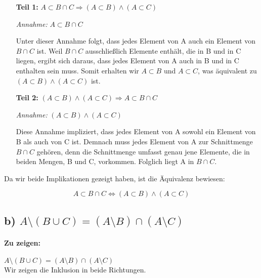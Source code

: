 \documentclass[12pt]{article}
\begin{document}
\begin{enumerate}
	\item[\textbf{Teil 1:}] \( A \subset B \cap C \Rightarrow (A \subset B) \land (A \subset C) \)
		
		\textit{Annahme:} \( A \subset B \cap C \)
		
		Unter dieser Annahme folgt, dass jedes Element von A auch ein Element von \( B \cap C \) ist. Weil \( B \cap C \) ausschließlich Elemente enthält, die in B und in C liegen, ergibt sich daraus, dass jedes Element von A auch in B und in C enthalten sein muss. Somit erhalten wir \( A \subset B \) und \( A \subset C \), was äquivalent zu \( (A \subset B) \land (A \subset C) \) ist.
		
	\item[\textbf{Teil 2:}] \( (A \subset B) \land (A \subset C) \Rightarrow A \subset B \cap C \)
		
		\textit{Annahme:} \( (A \subset B) \land (A \subset C) \)
		
		Diese Annahme impliziert, dass jedes Element von A sowohl ein Element von B als auch von C ist. Demnach muss jedes Element von A zur Schnittmenge \( B \cap C \) gehören, denn die Schnittmenge umfasst genau jene Elemente, die in beiden Mengen, B und C, vorkommen. Folglich liegt A in \( B \cap C \).
\end{enumerate}

Da wir beide Implikationen gezeigt haben, ist die Äquivalenz bewiesen:

\[ A \subset B \cap C \Leftrightarrow (A \subset B) \land (A \subset C) \]

\subsection*{b) \( A \setminus (B \cup C) = (A \setminus B) \cap (A \setminus C) \)}

\paragraph{Zu zeigen:}
\( A \setminus (B \cup C) = (A \setminus B) \cap (A \setminus C) \)\\Wir zeigen die Inklusion in beide Richtungen.
\end{document}
